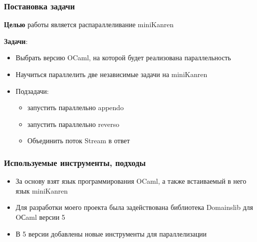 \documentclass{beamer}
\begin{document}
\begin{frame}
  \frametitle{Постановка задачи}
  \textbf{Целью} работы является распараллеливание miniKanren %

  \textbf{Задачи}:
  \begin{itemize}
    \item Выбрать версию OCaml, на которой будет реализована параллельность 
    \item Научиться параллелить две независимые задачи на miniKanren
    \item Подзадачи:
    \begin{itemize}
      \item запустить параллельно appendo
      \item запустить параллельно reverso
      \item Объединить поток Stream в ответ
    \end{itemize}
  \end{itemize}
\end{frame}




\begin{frame}
  \frametitle{Используемые инструменты, подходы}
  \begin{itemize}
    \item За основу взят язык программирования OCaml, а также встаиваемый в него язык miniKanren
    \item Для разработки моего проекта была задействована библиотека Domainslib для OСaml версии 5
    \item В 5 версии добавлены новые инструменты для параллелизации 
  \end{itemize}

\end{frame}
\end{document}
